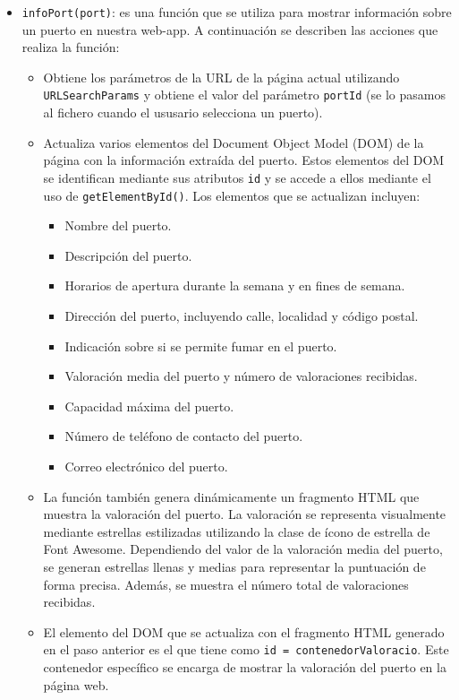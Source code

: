\documentclass{article}
\begin{document}
\begin{itemize}
    \item \texttt{infoPort(port)}: es una función que se utiliza para mostrar información sobre un puerto en nuestra web-app. A continuación se describen las acciones que realiza la función:
    \begin{itemize}
        \item Obtiene los parámetros de la URL de la página actual utilizando \texttt{URLSearchParams} y obtiene el valor del parámetro \texttt{portId} (se lo pasamos al fichero cuando el ususario selecciona un puerto).
        \item Actualiza varios elementos del Document Object Model (DOM) de la página con la información extraída del puerto. Estos elementos del DOM se identifican mediante sus atributos \texttt{id} y se accede a ellos mediante el uso de \texttt{getElementById()}. Los elementos que se actualizan incluyen:
        \begin{itemize}
            \item Nombre del puerto.
            \item Descripción del puerto.
            \item Horarios de apertura durante la semana y en fines de semana.
            \item Dirección del puerto, incluyendo calle, localidad y código postal.
            \item Indicación sobre si se permite fumar en el puerto.
            \item Valoración media del puerto y número de valoraciones recibidas.
            \item Capacidad máxima del puerto.
            \item Número de teléfono de contacto del puerto.
            \item Correo electrónico del puerto.
        \end{itemize}
        \item La función también genera dinámicamente un fragmento HTML que muestra la valoración del puerto. La valoración se representa visualmente mediante estrellas estilizadas utilizando la clase de ícono de estrella de Font Awesome. Dependiendo del valor de la valoración media del puerto, se generan estrellas llenas y medias para representar la puntuación de forma precisa. Además, se muestra el número total de valoraciones recibidas.
        \item El elemento del DOM que se actualiza con el fragmento HTML generado en el paso anterior es el que tiene como \texttt{id = contenedorValoracio}. Este contenedor específico se encarga de mostrar la valoración del puerto en la página web.

\end{itemize}
\end{itemize}
\end{document}

